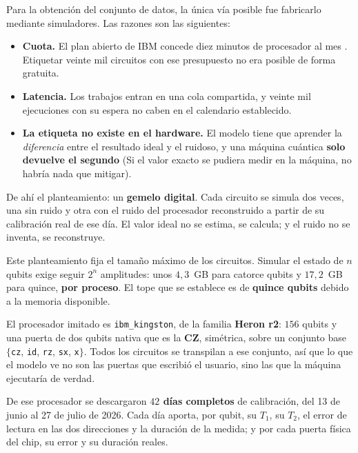 Para la obtención del conjunto de datos, la única vía posible fue fabricarlo mediante simuladores. Las razones son las siguientes:

\begin{itemize}
    \item \textbf{Cuota.} El plan abierto de IBM concede diez minutos de procesador al mes
          \cite{ibm2026productos}.
          Etiquetar veinte mil circuitos con ese presupuesto no era posible de forma gratuita.
    \item \textbf{Latencia.} Los trabajos entran en una cola compartida, y veinte mil
          ejecuciones con su espera no caben en el calendario establecido.
    \item \textbf{La etiqueta no existe en el hardware.} El modelo tiene que aprender la \emph{diferencia} entre el resultado ideal y el ruidoso, y una máquina cuántica \textbf{solo devuelve el segundo} (Si el valor exacto se pudiera medir en la máquina, no habría nada que mitigar).
\end{itemize}

De ahí el planteamiento: un \textbf{gemelo digital}. Cada circuito se simula dos veces, una sin
ruido y otra con el ruido del procesador reconstruido a partir de su calibración real de ese
día. El valor ideal no se estima, se calcula; y el ruido no se inventa, se reconstruye.

Este planteamiento fija el tamaño máximo de los circuitos. Simular el estado de $n$ qubits exige seguir $2^n$ amplitudes: unos $4{,}3$~GB para catorce qubits y $17{,}2$~GB para quince, \textbf{por proceso}. El tope que se establece es de \textbf{quince qubits} debido a la memoria disponible.



El procesador imitado es \texttt{ibm\_kingston}, de la familia \textbf{Heron r2}: $156$ qubits
y una puerta de dos qubits nativa que es la \textbf{CZ}, simétrica, sobre un conjunto base
$\{$\texttt{cz}, \texttt{id}, \texttt{rz}, \texttt{sx}, \texttt{x}$\}$. Todos los circuitos se
transpilan a ese conjunto, así que lo que el modelo ve no son las puertas que escribió el
usuario, sino las que la máquina ejecutaría de verdad.

De ese procesador se descargaron \textbf{$42$ días completos} de calibración, del 13 de junio
al 27 de julio de 2026. Cada día aporta, por qubit, su $T_1$, su $T_2$, el error de lectura en
las dos direcciones y la duración de la medida; y por cada puerta física del chip, su error y
su duración reales.

